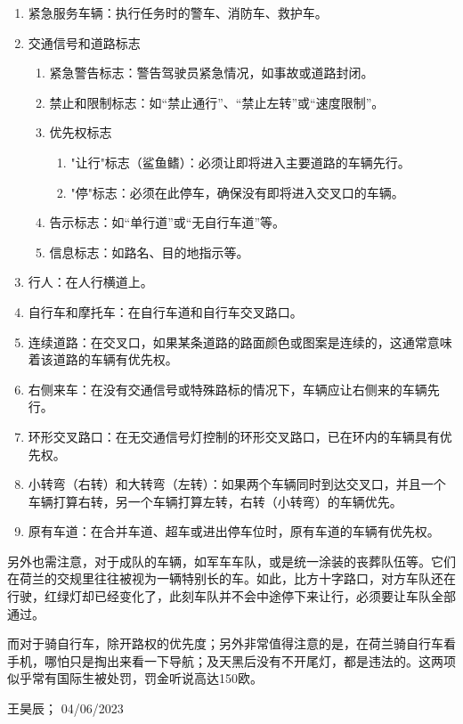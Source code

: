 \begin{enumerate}
\item 紧急服务车辆：执行任务时的警车、消防车、救护车。
\item 交通信号和道路标志
\begin{enumerate}
    \item 紧急警告标志：警告驾驶员紧急情况，如事故或道路封闭。
    \item 禁止和限制标志：如“禁止通行”、“禁止左转”或“速度限制”。
    \item 优先权标志
    \begin{enumerate}
        \item "让行"标志（鲨鱼鳍）：必须让即将进入主要道路的车辆先行。
        \item "停"标志：必须在此停车，确保没有即将进入交叉口的车辆。
    \end{enumerate}
    \item 告示标志：如“单行道”或“无自行车道”等。
    \item 信息标志：如路名、目的地指示等。
\end{enumerate}
\item 行人：在人行横道上。
\item 自行车和摩托车：在自行车道和自行车交叉路口。
\item 连续道路：在交叉口，如果某条道路的路面颜色或图案是连续的，这通常意味着该道路的车辆有优先权。
\item 右侧来车：在没有交通信号或特殊路标的情况下，车辆应让右侧来的车辆先行。
\item 环形交叉路口：在无交通信号灯控制的环形交叉路口，已在环内的车辆具有优先权。
\item 小转弯（右转）和大转弯（左转）：如果两个车辆同时到达交叉口，并且一个车辆打算右转，另一个车辆打算左转，右转（小转弯）的车辆优先。
\item 原有车道：在合并车道、超车或进出停车位时，原有车道的车辆有优先权。
\end{enumerate}

另外也需注意，对于成队的车辆，如军车车队，或是统一涂装的丧葬队伍等。它们在荷兰的交规里往往被视为一辆特别长的车。如此，比方十字路口，对方车队还在行驶，红绿灯却已经变化了，此刻车队并不会中途停下来让行，必须要让车队全部通过。

而对于骑自行车，除开路权的优先度；另外非常值得注意的是，在荷兰骑自行车看手机，哪怕只是掏出来看一下导航；及天黑后没有不开尾灯，都是违法的。这两项似乎常有国际生被处罚，罚金听说高达150欧。
\begin{flushright}
王昊辰； 04/06/2023
\end{flushright}

